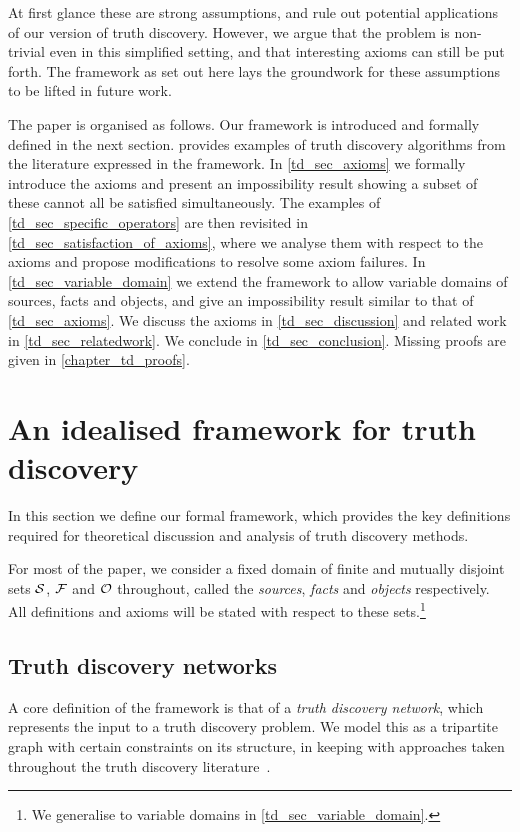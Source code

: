 At first glance these are strong assumptions, and rule out potential
applications of our version of truth discovery. However, we argue that the
problem is non-trivial even in this simplified setting, and that interesting
axioms can still be put forth. The framework as set out here lays the
groundwork for these assumptions to be lifted in future work.

The paper is organised as follows. Our framework is introduced and formally
defined in the next section.  provides examples of
truth discovery algorithms from the literature expressed in the framework. In
\cref{td_sec_axioms} we formally introduce the axioms and present an impossibility
result showing a subset of these cannot all be satisfied simultaneously. The
examples of \cref{td_sec_specific_operators} are then revisited in
\cref{td_sec_satisfaction_of_axioms}, where we analyse them with respect to the
axioms and propose modifications to resolve some axiom failures. In
\cref{td_sec_variable_domain} we extend the framework to allow variable domains of
sources, facts and objects, and give an impossibility result similar to that of
\cref{td_sec_axioms}. We discuss the axioms in \cref{td_sec_discussion} and related
work in \cref{td_sec_relatedwork}. We conclude
in \cref{td_sec_conclusion}. Missing proofs are given in \cref{chapter_td_proofs}.


\section{An idealised framework for truth discovery}
\label{td_sec_framework}

In this section we define our formal framework, which provides the key
definitions required for theoretical discussion and analysis of truth discovery
methods.

For most of the paper, we consider a fixed domain of finite and mutually
disjoint sets $\S$, $\F$ and $\O$ throughout, called the \emph{sources},
\emph{facts} and \emph{objects} respectively. All definitions and axioms will
be stated with respect to these sets.\footnote{We generalise to variable
domains in \cref{td_sec_variable_domain}.}

\subsection{Truth discovery networks}

A core definition of the framework is that of a \emph{truth discovery network},
which represents the input to a truth discovery problem. We model this as a
tripartite graph with certain constraints on its structure, in keeping with
approaches taken throughout the truth discovery
literature~\cite{yin2008,gupta2011survey}.

